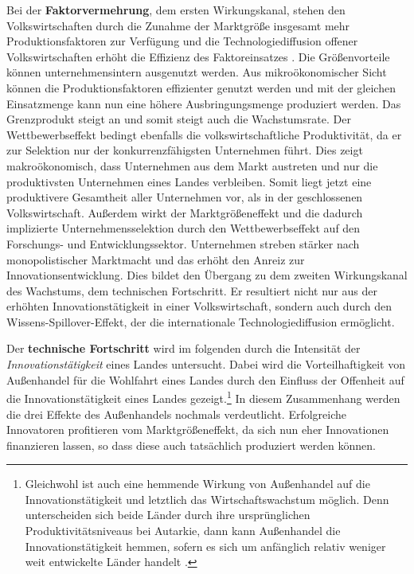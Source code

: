 Bei der \textbf{Faktorvermehrung}, dem ersten Wirkungskanal, stehen den Volkswirtschaften durch die Zunahme der Marktgrö{\ss}e insgesamt mehr Produktionsfaktoren zur Verf{\"u}gung und die Technologiediffusion offener Volkswirtschaften erh{\"o}ht die Effizienz des Faktoreinsatzes \citep{Gandolfo.1998}. Die Gr{\"o}{\ss}envorteile k{\"o}nnen unternehmensintern ausgenutzt werden. Aus mikro{\"o}konomischer Sicht k{\"o}nnen die Produktionsfaktoren effizienter genutzt werden und mit der gleichen Einsatzmenge kann nun eine h{\"o}here Ausbringungsmenge produziert werden. Das Grenzprodukt steigt an und somit steigt auch die Wachstumsrate. Der Wettbewerbseffekt bedingt ebenfalls die volkswirtschaftliche Produktivit{\"a}t, da er zur Selektion nur der konkurrenzf{\"a}higsten Unternehmen f{\"u}hrt. Dies zeigt makro{\"o}konomisch, dass Unternehmen aus dem Markt austreten und nur die produktivsten Unternehmen eines Landes verbleiben. Somit liegt jetzt eine produktivere Gesamtheit aller Unternehmen vor, als in der geschlossenen Volkswirtschaft. Au{\ss}erdem wirkt der Marktgr{\"o}{\ss}eneffekt und die dadurch implizierte Unternehmensselektion durch den Wettbewerbseffekt auf den Forschungs- und Entwicklungssektor. Unternehmen streben st{\"a}rker nach monopolistischer Marktmacht und das erh{\"o}ht den Anreiz zur Innovationsentwicklung.  Dies bildet den Übergang zu dem zweiten Wirkungskanal des Wachstums, dem technischen Fortschritt. Er resultiert nicht nur aus der erhöhten Innovationstätigkeit in einer Volkswirtschaft, sondern auch durch den Wissens-Spillover-Effekt, der die internationale Technologiediffusion ermöglicht.\newline


Der \textbf{technische Fortschritt} wird im folgenden durch die Intensität der \textit{Innovationstätigkeit} eines Landes untersucht. Dabei wird die Vorteilhaftigkeit von Au{\ss}enhandel f{\"u}r die Wohlfahrt eines Landes durch den Einfluss der Offenheit auf die Innovationst{\"a}tigkeit eines Landes gezeigt.\footnote{Gleichwohl ist auch eine hemmende Wirkung von Au{\ss}enhandel auf die Innovationst{\"a}tigkeit und letztlich das Wirtschaftswachstum m{\"o}glich. Denn unterscheiden sich beide L{\"a}nder durch ihre ursprünglichen Produktivit{\"a}tsniveaus bei Autarkie, dann kann Au{\ss}enhandel die Innovationst{\"a}tigkeit hemmen, sofern es sich um anf{\"a}nglich relativ weniger weit entwickelte L{\"a}nder handelt \citep{Devereux.1994,RiveraBatiz.1991a}.} In diesem Zusammenhang werden die drei Effekte des Au{\ss}enhandels nochmals verdeutlicht. \newline Erfolgreiche Innovatoren profitieren vom Marktgr{\"o}{\ss}eneffekt, da sich nun eher Innovationen finanzieren lassen, so dass diese auch tats{\"a}chlich produziert werden k{\"o}nnen. \newline 


